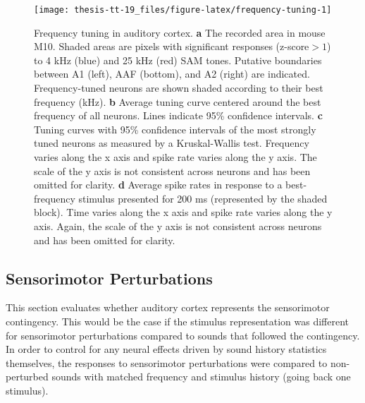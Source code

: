 \documentclass[]{report}
\theoremstyle{definition}
\theoremstyle{definition}
\theoremstyle{definition}
\theoremstyle{remark}
\begin{document}
\begin{figure}

{\centering \texttt{[image: thesis-tt-19\_files/figure-latex/frequency-tuning-1]} 

}

\caption{Frequency tuning in auditory cortex. \textbf{a}
The recorded area in mouse M10. Shaded areas are pixels with significant
responses (z-score\(>1\)) to 4 kHz (blue) and 25 kHz (red) SAM tones.
Putative boundaries between A1 (left), AAF (bottom), and A2 (right) are
indicated. Frequency-tuned neurons are shown shaded according to their
best frequency (kHz). \textbf{b} Average tuning curve centered around
the best frequency of all neurons. Lines indicate 95\% confidence
intervals. \textbf{c} Tuning curves with 95\% confidence intervals of
the most strongly tuned neurons as measured by a Kruskal-Wallis test.
Frequency varies along the x axis and spike rate varies along the y
axis. The scale of the y axis is not consistent across neurons and has
been omitted for clarity. \textbf{d} Average spike rates in response to
a best-frequency stimulus presented for 200 ms (represented by the
shaded block). Time varies along the x axis and spike rate varies along
the y axis. Again, the scale of the y axis is not consistent across
neurons and has been omitted for clarity.}\label{fig:frequency-tuning}
\end{figure}


















\hypertarget{sensorimotor-perturbations}{%
\subsection{Sensorimotor
Perturbations}\label{sensorimotor-perturbations}}

This section evaluates whether auditory cortex represents the
sensorimotor contingency. This would be the case if the stimulus
representation was different for sensorimotor perturbations compared to
sounds that followed the contingency. In order to control for any neural
effects driven by sound history statistics themselves, the responses to
sensorimotor perturbations were compared to non-perturbed sounds with
matched frequency and stimulus history (going back one stimulus).
\end{document}
